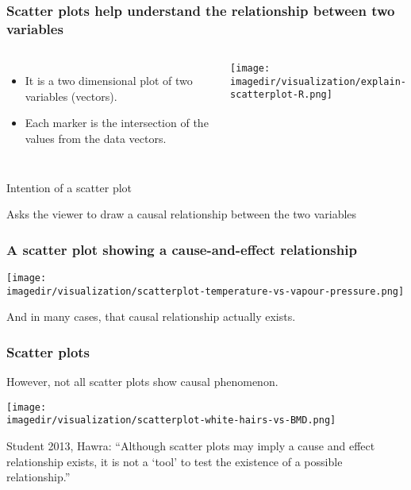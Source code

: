 \begin{frame}\frametitle{Scatter plots help understand the relationship between two variables}
	\begin{columns}[c]
			\begin{itemize}
				\item	It is a two dimensional plot of two variables (vectors). \pause
				\item	Each marker is the intersection of the values from the data vectors.
			\end{itemize}
			\centerline{\texttt{[image: \\imagedir/visualization/explain-scatterplot-R.png]}}
	\end{columns}
		
	\begin{block}
		{Intention of a scatter plot} 
		\begin{center}
			Asks the viewer to draw a causal relationship between the two variables 
		\end{center}
	\end{block}
\end{frame}

\begin{frame}\frametitle{A scatter plot showing a cause-and-effect relationship}
	\begin{center}
		\texttt{[image: \\imagedir/visualization/scatterplot-temperature-vs-vapour-pressure.png]}
	\end{center}
	\vspace{-24pt}
	{\color{myOrange}And in many cases, that causal relationship actually exists.}
\end{frame}

\begin{frame}\frametitle{Scatter plots}
	However, not all scatter plots show causal phenomenon. 
	\begin{center}
		\texttt{[image: \\imagedir/visualization/scatterplot-white-hairs-vs-BMD.png]}
	\end{center}
	\pause
	\vspace{-12pt}
	{\color{myOrange}Student 2013, Hawra: {\small ``Although scatter plots may imply a cause and effect relationship exists, it is not a `tool' to test the existence of a possible relationship.''}}
\end{frame}

